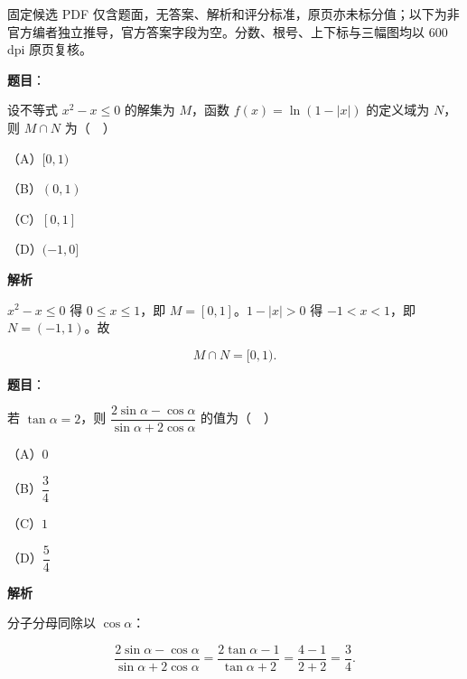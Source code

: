 

\begin{gktip}
固定候选 PDF 仅含题面，无答案、解析和评分标准，原页亦未标分值；以下为非官方编者独立推导，官方答案字段为空。分数、根号、上下标与三幅图均以 600 dpi 原页复核。
\end{gktip}

\begin{answer}

\textbf{题目}：

设不等式 $x^2-x\leqslant0$ 的解集为 $M$，函数 $f(x)=\ln(1-|x|)$ 的定义域为 $N$，则 $M\cap N$ 为（　）

（A）$[0,1)$

（B）$(0,1)$

（C）$[0,1]$

（D）$(-1,0]$

\textbf{解析}

$x^2-x\leqslant0$ 得 $0\leqslant x\leqslant1$，即 $M=[0,1]$。$1-|x|>0$ 得 $-1<x<1$，即 $N=(-1,1)$。故

\nopagebreak[4]
\[M\cap N=[0,1).\]


\end{answer}
\begin{answer}

\textbf{题目}：

若 $\tan\alpha=2$，则 $\dfrac{2\sin\alpha-\cos\alpha}{\sin\alpha+2\cos\alpha}$ 的值为（　）

（A）$0$

（B）$\dfrac34$

（C）$1$

（D）$\dfrac54$

\textbf{解析}

分子分母同除以 $\cos\alpha$：

\nopagebreak[4]
\[\frac{2\sin\alpha-\cos\alpha}{\sin\alpha+2\cos\alpha}
=\frac{2\tan\alpha-1}{\tan\alpha+2}
=\frac{4-1}{2+2}=\frac34.\]


\end{answer}
